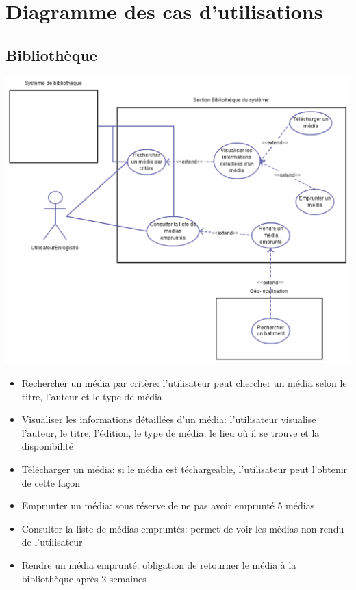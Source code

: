 \chapter{Diagramme des cas d'utilisations}


\section{Bibliothèque}
\includegraphics[scale=0.7,angle=90]{cu/Bibliotheque.pdf}
\newpage
\begin{itemize}
\item Rechercher un média par critère: l'utilisateur peut chercher un média selon le titre, l'auteur et le type de média
\item Visualiser les informations détaillées d'un média: l'utilisateur visualise l'auteur, le titre, l'édition, le type de média, le lieu où il se trouve et la disponibilité
\item Télécharger un média: si le média est téchargeable, l'utilisateur peut l'obtenir de cette façon
\item Emprunter un média: sous réserve de ne pas avoir emprunté 5 médias
\item Consulter la liste de médias empruntés: permet de voir les médias non rendu de l'utilisateur
\item Rendre un média emprunté: obligation de retourner le média à la bibliothèque après 2 semaines
\end{itemize}
\newpage


